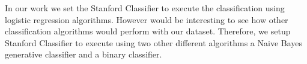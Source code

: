 In our work we set the Stanford Classifier to execute the classification using logistic regression algorithms. However would be interesting to see how other classification algorithms would perform with our dataset. Therefore, we setup Stanford Classifier to execute using two other different algorithms a Naive Bayes generative classifier and a binary classifier. 




 



